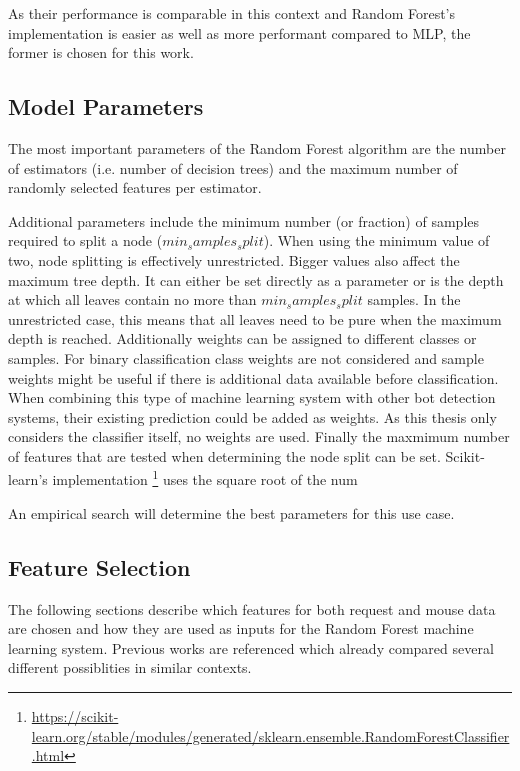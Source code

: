 \documentclass[
    fontsize=12pt,
    headings=small,
    parskip=half,           %
    bibliography=totoc,
    numbers=noenddot,       %
    open=any,               %
    final                   %
]{scrreprt}
\begin{document}
As their performance is comparable in this context and Random Forest's implementation is easier as well as more performant compared to MLP, the former is chosen for this work.

\subsection{Model Parameters}


The most important parameters of the Random Forest algorithm are the number of estimators (i.e. number of decision trees) and the maximum number of randomly selected features per estimator. \todo

Additional parameters include the minimum number (or fraction) of samples required to split a node ($min_samples_split$). When using the minimum value of two, node splitting is effectively unrestricted. Bigger values also affect the maximum tree depth. It can either be set directly as a parameter or is the depth at which all leaves contain no more than $min_samples_split$ samples. In the unrestricted case, this means that all leaves need to be pure when the maximum depth is reached. Additionally weights can be assigned to different classes or samples. For binary classification class weights are not considered and sample weights might be useful if there is additional data available before classification. When combining this type of machine learning system with other bot detection systems, their existing prediction could be added as weights. As this thesis only considers the classifier itself, no weights are used. Finally the maxmimum number of features that are tested when determining the node split can be set. Scikit-learn's implementation \footnote{\url{https://scikit-learn.org/stable/modules/generated/sklearn.ensemble.RandomForestClassifier.html}} uses the square root of the num

An empirical search will determine the best parameters for this use case.

\subsection{Feature Selection}

The following sections describe which features for both request and mouse data are chosen and how they are used as inputs for the Random Forest machine learning system. Previous works are referenced which already compared several different possiblities in similar contexts.
\end{document}
